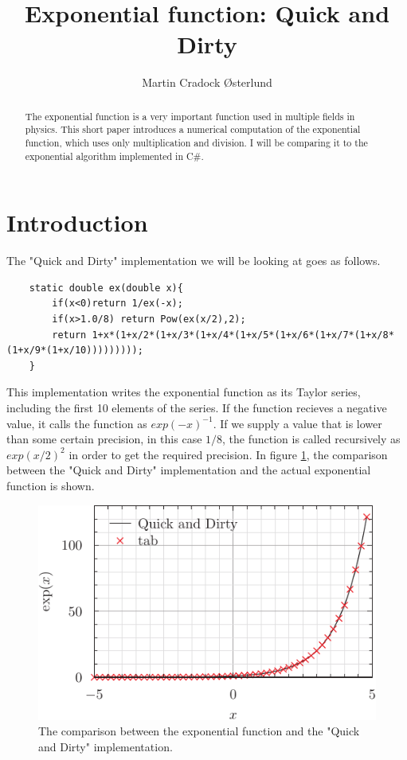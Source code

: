 \documentclass[10pt,a4paper]{article}
\begin{document}
\title{Exponential function: Quick and Dirty}
\author{Martin Cradock Østerlund}
\maketitle

\begin{abstract}
    The exponential function is a very important function used in multiple fields in physics. This short paper introduces a 
    numerical computation of the exponential function, which uses only multiplication and division. I will be comparing it to 
    the exponential algorithm implemented in C\#. 
\end{abstract}

\section{Introduction}
    The "Quick and Dirty" implementation we will be looking at goes as follows.
    \begin{verbatim}
    static double ex(double x){
        if(x<0)return 1/ex(-x);
        if(x>1.0/8) return Pow(ex(x/2),2);
        return 1+x*(1+x/2*(1+x/3*(1+x/4*(1+x/5*(1+x/6*(1+x/7*(1+x/8*(1+x/9*(1+x/10)))))))));
    }
    \end{verbatim}

    This implementation writes the exponential function as its Taylor series, including the first 10 elements of the series. If 
    the function recieves a negative value, it calls the function as $exp(-x)^{-1}$. If we supply a value that is lower than some certain
    precision, in this case $1/8$, the function is called recursively as $exp(x/2)^{2}$ in order to get the required precision. In figure 
    \ref{fig1}, the comparison between the "Quick and Dirty" implementation and the actual exponential function is shown.

    \begin{figure}
        \includegraphics{exp_pyxplot.pdf}
        \caption{The comparison between the exponential function and the "Quick and Dirty" implementation.}
        \label{fig1}
    \end{figure}
    
\end{document}
